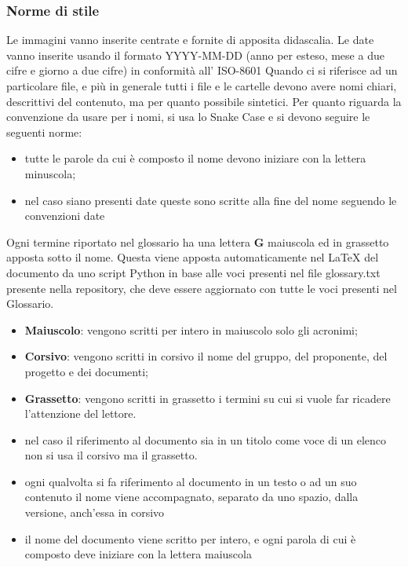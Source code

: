 	    \subsubsection{Norme di stile}
	    Le immagini vanno inserite centrate e fornite di apposita didascalia.
	    Le date vanno inserite usando il formato YYYY-MM-DD (anno per esteso, mese a due cifre e giorno a due cifre) in conformità all' ISO-8601
	    Quando ci si riferisce ad un particolare file, e più in generale tutti i file e le cartelle devono avere nomi chiari, descrittivi del contenuto, ma per quanto possibile sintetici.
	    Per quanto riguarda la convenzione da usare per i nomi, si usa lo Snake Case e si devono seguire le seguenti norme:
	    \begin{itemize}
	        \item tutte le parole da cui è composto il nome devono iniziare con la lettera minuscola;
	        \item nel caso siano presenti date queste sono scritte alla fine del nome seguendo le convenzioni date
	    \end{itemize}
	    Ogni termine riportato nel glossario ha una lettera \textbf{G} maiuscola ed in grassetto apposta sotto il nome. Questa viene apposta automaticamente nel LaTeX del documento da uno script Python in base alle voci presenti nel file glossary.txt presente nella repository, che deve essere aggiornato con tutte le voci presenti nel Glossario.
	    \begin{itemize}
	        \item \textbf{Maiuscolo}: vengono scritti per intero in maiuscolo solo gli acronimi;
	        \item \textbf{Corsivo}: vengono scritti in corsivo il nome del gruppo, del proponente, del progetto e dei documenti;
	        \item \textbf{Grassetto}: vengono scritti in grassetto i termini su cui si vuole far ricadere l'attenzione del lettore.
	    \end{itemize}
	    \begin{itemize}
	        \item nel caso il riferimento al documento sia in un titolo come voce di un elenco non si usa il corsivo ma il grassetto.
	        \item ogni qualvolta si fa riferimento al documento in un testo o ad un suo contenuto il nome viene accompagnato, separato da uno spazio, dalla versione, anch'essa in corsivo
	        \item il nome del documento viene scritto per intero, e ogni parola di cui è composto deve iniziare con la lettera maiuscola
	    \end{itemize}
